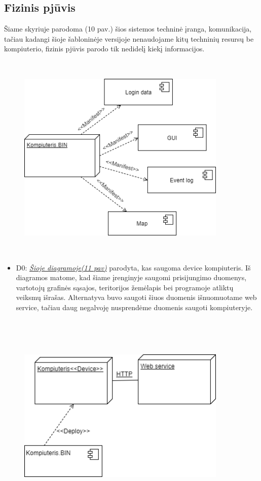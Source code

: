 \documentclass[oneside]{VUMIFPSkursinis}
\begin{document}
\subsection{Fizinis pjūvis}
	Šiame skyriuje parodoma (10 pav.) šios sistemos techninė įranga, komunikacija, tačiau kadangi šioje šabloninėje versijoje nenaudojame kitų techninių resursų be kompiuterio, fizinis pjūvis parodo tik nedidelį kiekį informacijos.
	\newline
	\vskip 0.5cm
	\begin{figure}[H]
	\centering	
	\includegraphics[width=10cm,height=10cm,keepaspectratio]{Deployment.png}
	\caption{}
	\label{fig:Deployment}
\end{figure}
	\begin{itemize}
		\item D0: \hyperref[fig:Deployment]{\textit{Šioje diagramoje(11 pav)}} parodyta, kas saugoma device kompiuteris. 
		Iš diagramos matome, kad šiame įrenginyje saugomi prisijungimo duomenys, vartotojų grafinės sąsajos, teritorijos žemėlapis bei programoje atliktų veiksmų išrašas. Alternatyva buvo saugoti šiuos duomenis išnuomuotame web service, tačiau daug negalvoję nusprendėme duomenis saugoti kompiuteryje.
	\end{itemize}
		\begin{figure}[H]
		\centering	
	\includegraphics[width=10cm,height=10cm,keepaspectratio]{Deployment0.png}
	\caption{}
	\label{fig:Deployment0}
\end{figure}
\end{document}
